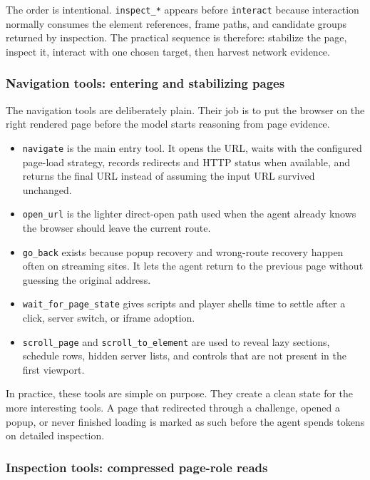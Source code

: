 The order is intentional. \texttt{inspect\_*} appears before \texttt{interact} because
interaction normally consumes the element references, frame paths, and candidate groups
returned by inspection. The practical sequence is therefore: stabilize the page, inspect
it, interact with one chosen target, then harvest network evidence.



\subsubsection{Navigation tools: entering and stabilizing pages}

The navigation tools are deliberately plain. Their job is to put the browser on the
right rendered page before the model starts reasoning from page evidence.
\begin{itemize}
  \item \texttt{navigate} is the main entry tool. It opens the URL, waits with the
  configured page-load strategy, records redirects and HTTP status when available, and
  returns the final URL instead of assuming the input URL survived unchanged.
  \item \texttt{open\_url} is the lighter direct-open path used when the agent already
  knows the browser should leave the current route.
  \item \texttt{go\_back} exists because popup recovery and wrong-route recovery happen
  often on streaming sites. It lets the agent return to the previous page without
  guessing the original address.
  \item \texttt{wait\_for\_page\_state} gives scripts and player shells time to settle
  after a click, server switch, or iframe adoption.
  \item \texttt{scroll\_page} and \texttt{scroll\_to\_element} are used to reveal lazy
  sections, schedule rows, hidden server lists, and controls that are not present in the
  first viewport.
\end{itemize}

In practice, these tools are simple on purpose. They create a clean state for the more
interesting tools. A page that redirected through a challenge, opened a popup, or never
finished loading is marked as such before the agent spends tokens on detailed
inspection.

\subsubsection{Inspection tools: compressed page-role reads}

